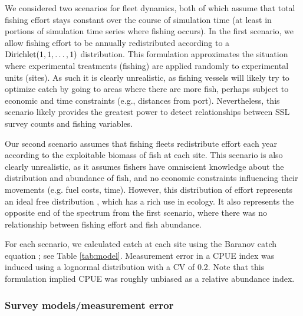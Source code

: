 \documentclass[11pt]{article}
\begin{document}
We considered two scenarios for fleet dynamics, both of which assume that total fishing effort stays constant
over the course of simulation time (at least in portions of simulation time series where fishing occurs).  In the first scenario, we allow fishing effort to be annually redistributed according to a ${\rm Dirichlet}(1,1,\hdots,1)$ distribution.  This formulation approximates the situation where experimental treatments (fishing) are applied randomly to experimental units (sites).  As such it is clearly unrealistic, as fishing vessels will likely try to optimize catch by going to areas where there are more fish, perhaps subject
to economic and time constraints (e.g., distances from port).  Nevertheless, this scenario likely provides the greatest power to detect relationships between SSL survey counts and fishing variables.

Our second scenario assumes that fishing fleets redistribute effort each year according to the exploitable biomass of fish at each site.  This scenario is also clearly unrealistic, as it assumes fishers have omniscient knowledge about the distribution and abundance of fish, and no economic constraints influencing their movements (e.g. fuel costs, time).  However, this distribution of effort represents an ideal free distribution \citep{FretwellLucas1970}, which has a rich use in ecology.  It also represents the opposite end of the spectrum from the first scenario, where there was no relationship between fishing effort and fish abundance.

For each scenario, we calculated catch at each site using the Baranov catch equation \citep{Baranov1918}; see Table \ref{tab:model}.  Measurement error in a CPUE index was induced using a lognormal distribution with a CV of 0.2.  Note that this formulation implied CPUE was roughly unbiased as a relative abundance index.


\subsubsection{Survey models/measurement error}
\end{document}
